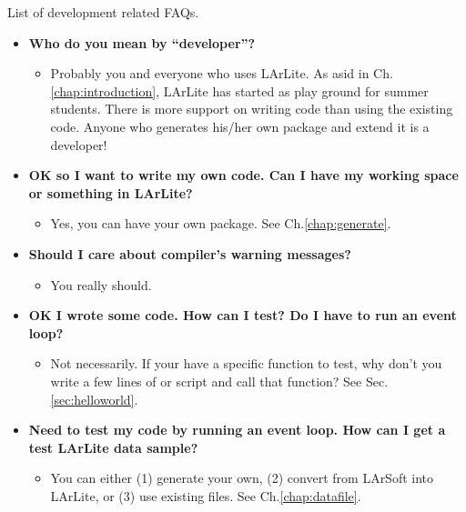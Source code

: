 List of development related FAQs.

\begin{itemize}

\item[] {\bf Who do you mean by ``developer''?}
  \begin{itemize}
    \item Probably you and everyone who uses LArLite. As asid in Ch.\ref{chap:introduction}, LArLite has started as \CPP play ground for summer students. There is more support on writing code than using the existing code. Anyone who generates his/her own package and extend it is a developer!
  \end{itemize}

\item[] {\bf OK so I want to write my own code. Can I have my working space or something in LArLite?}
  \begin{itemize}
    \item Yes, you can have your own package. See Ch.\ref{chap:generate}.
  \end{itemize}

\item[] {\bf Should I care about compiler's warning messages?}
  \begin{itemize}
    \item You really should.
  \end{itemize}

\item[] {\bf OK I wrote some code. How can I test? Do I have to run an event loop?}
  \begin{itemize}
    \item Not necessarily. If your have a specific function to test, why don't you write a few lines of \PyROOT or \CINT script and call that function? See Sec.\ref{sec:helloworld}.
  \end{itemize}

\item[] {\bf Need to test my code by running an event loop. How can I get a test LArLite data sample?}
  \begin{itemize}
    \item You can either (1) generate your own, (2) convert from LArSoft into LArLite, or (3) use existing files. See Ch.\ref{chap:datafile}.
  \end{itemize}


\end{itemize}
